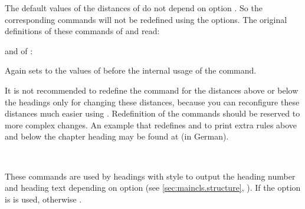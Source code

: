 The default values of the distances of  do not depend on option
. So the corresponding commands will not be redefined using
the options. The original definitions of these commands of 
and  read:
\begin{lstcode}
  \newcommand*{\partheadstartvskip}{%
    \null\vskip-\baselineskip\vskip\@tempskipa
  }
  \newcommand*{\partheadmidvskip}{%
    \par\nobreak
    \vskip\@tempskipa
  }
  \newcommand*{\partheadendvskip}{%
    \vskip\@tempskipa\newpage
  }
\end{lstcode}
and of :
\begin{lstcode}
  \newcommand*{\partheadstartvskip}{%
    \addvspace{\@tempskipa}%
  }
  \newcommand*{\partheadmidvskip}{%
    \par\nobreak
  }
  \newcommand*{\partheadendvskip}{%
    \vskip\@tempskipa
  }
\end{lstcode}
Again  sets  to the
values of  before
the internal usage of the command.

It is not recommended to redefine the command for the
distances above or below the headings only for changing these distances,
because you can reconfigure these distances much easier using
. Redefinition of the commands should be
reserved to more complex changes. An  example that
redefines  and  to
print extra rules above and below the chapter heading may be found at
\cite{homepage} (in German).%
%
%
%
%
%
%
%
%


\begin{Declaration}
    \\
\end{Declaration}
%
%
These commands are used
by headings with style  to output the heading number and
heading text depending on option
%
 (see \autoref{sec:maincls.structure},
). If the option is
  is used, otherwise
.

